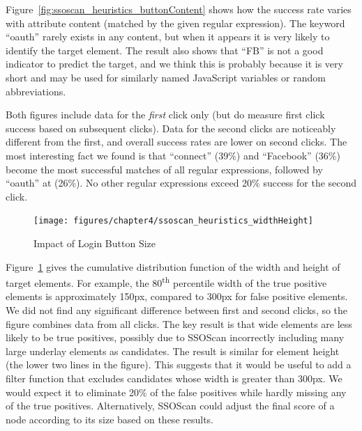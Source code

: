 Figure~\ref{fig:ssoscan_heuristics_buttonContent} shows how the success rate varies with attribute content (matched by the given regular expression).  The keyword ``oauth'' rarely exists in any content, but when it appears it is very likely to identify the target element.  The result also shows that ``FB'' is not a good indicator to predict the target, and we think this is probably because it is very short and may be used for similarly named JavaScript variables or random abbreviations.

Both figures include data for the \emph{first} click only (but do measure first click success based on subsequent clicks).  Data for the second clicks are noticeably different from the first, and overall success rates are lower on second clicks.  The most interesting fact we found is that ``connect'' (39\%) and ``Facebook'' (36\%) become the most successful matches of all regular expressions, followed by ``oauth'' at (26\%).  No other regular expressions exceed 20\% success for the second click.  


\begin{figure}[htb]
\centering
\texttt{[image: figures/chapter4/ssoscan\_heuristics\_widthHeight]}
\caption{Impact of Login Button Size}
\label{fig:ssoscan_heuristics_widthHeight}
\end{figure}

 Figure~\ref{fig:ssoscan_heuristics_widthHeight} gives the cumulative distribution function of the width and height of target elements.  For example, the 80\textsuperscript{th} percentile width of the true positive elements is approximately 150px, compared to 300px for false positive elements.  We did not find any significant difference between first and second clicks, so the figure combines data from all clicks.  The key result is that wide elements are less likely to be true positives, possibly due to SSOScan incorrectly including many large underlay elements as candidates.  The result is similar for element height (the lower two lines in the figure).  This suggests that it would be useful to add a filter function that excludes candidates whose width is greater than 300px.  We would expect it to eliminate 20\% of the false positives while hardly missing any of the true positives.  Alternatively, SSOScan could adjust the final score of a node according to its size based on these results.

